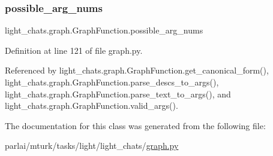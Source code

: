 \mbox{\label{classlight__chats_1_1graph_1_1GraphFunction_a2d40c8aa5303afce9e93be14593fca78}} 
\subsubsection{\texorpdfstring{possible\+\_\+arg\+\_\+nums}{possible\_arg\_nums}}
{\footnotesize\ttfamily light\+\_\+chats.\+graph.\+Graph\+Function.\+possible\+\_\+arg\+\_\+nums}



Definition at line 121 of file graph.\+py.



Referenced by light\+\_\+chats.\+graph.\+Graph\+Function.\+get\+\_\+canonical\+\_\+form(), light\+\_\+chats.\+graph.\+Graph\+Function.\+parse\+\_\+descs\+\_\+to\+\_\+args(), light\+\_\+chats.\+graph.\+Graph\+Function.\+parse\+\_\+text\+\_\+to\+\_\+args(), and light\+\_\+chats.\+graph.\+Graph\+Function.\+valid\+\_\+args().



The documentation for this class was generated from the following file\+:\begin{DoxyCompactItemize}
\item 
parlai/mturk/tasks/light/light\+\_\+chats/\hyperlink{parlai_2mturk_2tasks_2light_2light__chats_2graph_8py}{graph.\+py}\end{DoxyCompactItemize}
